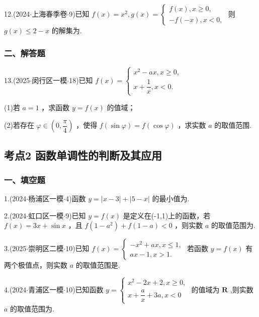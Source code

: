 12.(2024$\cdot$上海春季卷$\cdot$9)已知 $f\left( x\right)  = {x}^{2},g\left( x\right)  = \left\{  \begin{array}{l} f\left( x\right) ,x \geq  0, \\   - f\left( {-x}\right) ,x < 0, \end{array}\right.$ 则 $g\left( x\right)  \leq  2 - x$ 的解集为\blkda[2]{}.

\subsubsection*{二、解答题}

13.(2025$\cdot$闵行区一模$\cdot$18)已知 $f\left( x\right)  = \left\{  \begin{array}{l} {x}^{2} - {ax},x \geq  0, \\  x + \dfrac{1}{x},x < 0. \end{array}\right.$

(1)若 $a = 1$ ，求函数 $y = f\left( x\right)$ 的值域；

(2)若存在 $\varphi  \in  \left( {0,\dfrac{\pi }{4}}\right)$ ，使得 $f\left( {\sin \varphi }\right)  = f\left( {\cos \varphi }\right)$ ，求实数 $a$ 的取值范围.

\subsection*{考点2 函数单调性的判断及其应用}

\subsubsection*{一、填空题}

1.(2024$\cdot$杨浦区一模$\cdot$4)函数 $y = \left| {x - 3}\right|  + \left| {5 - x}\right|$ 的最小值为\blkda[2]{}.

2.(2024$\cdot$虹口区一模$\cdot$9)已知 $y = f\left( x\right)$ 是定义在(-1,1)上的函数，若 $f\left( x\right)  = {3x} + \sin x$ ，且 $f\left( {1 - {a}^{2}}\right)  + f\left( {1 - a}\right)  < 0$ ，则实数 $a$ 的取值范围为\blkda[2]{}.

3.(2025$\cdot$崇明区二模$\cdot$10)已知 $f\left( x\right)  = \left\{  \begin{array}{l}  - {x}^{2} + {ax},x \leq  1, \\  {ax} - 1,x > 1. \end{array}\right.$ 若函数 $y = f\left( x\right)$ 有两个极值点，则实数 $a$ 的取值范围是\blkda[2]{}.

4.(2024$\cdot$青浦区一模$\cdot$10)已知函数 $y = \left\{  \begin{array}{l} {x}^{2} - {2x} + 2,x \geq  0, \\  x + \dfrac{a}{x} + {3a},x < 0 \end{array}\right.$ 的值域为 $\mathbf{R}$ ,则实数 $a$ 的取值范围为\blkda[2]{}.

